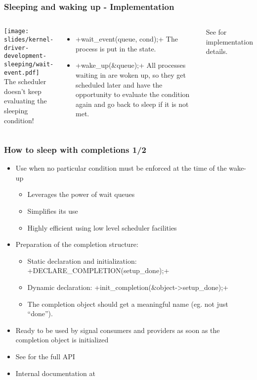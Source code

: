 \begin{frame}[fragile]
  \frametitle{Sleeping and waking up - Implementation}
  \begin{columns}
      \texttt{[image: slides/kernel-driver-development-sleeping/wait-event.pdf]}\\
       The scheduler doesn't keep evaluating the sleeping condition!
       \begin{itemize}
       \item {}+wait_event(queue, cond);+
         The process is put in the  state.
       \item {}+wake_up(&queue);+
         All processes waiting in  are woken up, so they get
         scheduled later and have the opportunity to evaluate the
         condition again and go back to sleep if it is not met.
       \end{itemize}
       See  for implementation details.
  \end{columns}
\end{frame}

\begin{frame}[fragile]
  \frametitle{How to sleep with completions 1/2}
  \begin{itemize}
  \item Use  when no particular condition
    must be enforced at the time of the wake-up
    \begin{itemize}
    \item Leverages the power of wait queues
    \item Simplifies its use
    \item Highly efficient using low level scheduler facilities
    \end{itemize}
  \item Preparation of the completion structure:
    \begin{itemize}
    \item Static declaration and initialization:
      +DECLARE_COMPLETION(setup_done);+
    \item Dynamic declaration:
      +init_completion(&object->setup_done);+
    \item The completion object should get a meaningful name (eg. not
      just ``done'').
    \end{itemize}
  \item Ready to be used by signal consumers and providers as soon as
    the completion object is initialized
  \item See  for the full API
  \item Internal documentation at 
  \end{itemize}
\end{frame}

